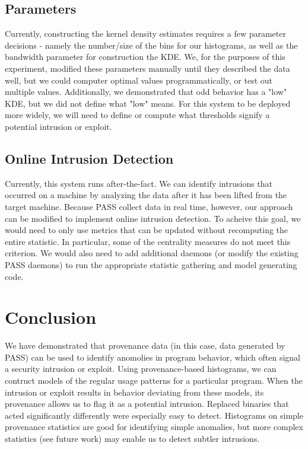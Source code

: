 \documentclass[10pt,twocolumn]{article}
\begin{document}
\subsection{Parameters}
Currently, constructing the kernel density estimates requires a few parameter decisions - namely the number/size of the bins for our histograms, as well as the bandwidth parameter for construction the KDE. We, for the purposes of this experiment, modified these parameters manually until they described the data well, but we could computer optimal values programmatically, or test out multiple values. Additionally, we demonstrated that odd behavior has a "low" KDE, but we did not define what "low" means. For this system to be deployed more widely, we will need to define or compute what thresholds signify a potential intrusion or exploit.
\subsection{Online Intrusion Detection}
Currently, this system runs after-the-fact. We can identify intrusions that occurred on a machine by analyzing the data after it has been lifted from the target machine. Because PASS collect data in real time, however, our approach can be modified to implement online intrusion detection. To acheive this goal, we would need to only use metrics that can be updated without recomputing the entire statistic. In particular, some of the centrality measures do not meet this criterion. We would also need to add additional daemons (or modify the existing PASS daemons) to run the appropriate statistic gathering and model generating code. 
\section{Conclusion}
We have demonstrated that provenance data (in this case, data generated by PASS) can be used to identify anomolies in program behavior, which often signal a security intrusion or exploit. Using provenance-based histograms, we can contruct models of the regular usage patterns for a particular program. When the intrusion or exploit results in behavior deviating from these models, its provenance allows us to flag it as a potential intrusion. Replaced binaries that acted significantly differently were especially easy to detect. Histograms on simple provenance statistics are good for identifying simple anomalies, but more complex statistics (see future work) may enable us to detect subtler intrusions.

%
\end{document}
